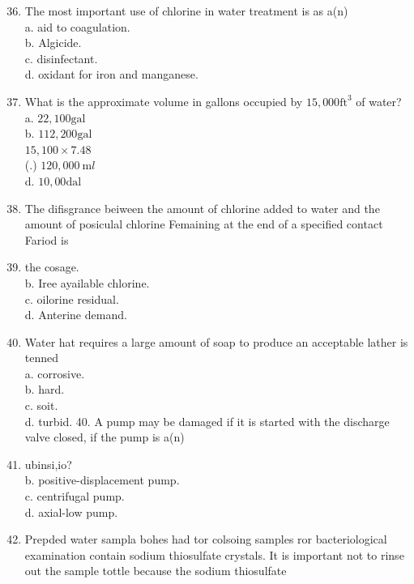 \documentclass[10pt]{article}
\begin{document}
\begin{enumerate}
  \setcounter{enumi}{35}
  \item The most important use of chlorine in water treatment is as a(n)\\
a. aid to coagulation.\\
b. Algicide.\\
c. disinfectant.\\
d. oxidant for iron and manganese.

  \item What is the approximate volume in gallons occupied by $15,000 \mathrm{ft}^{3}$ of water?\\
a. $22,100 \mathrm{gal}$\\
b. $112,200 \mathrm{gal}$\\
$15,100 \times 7.48$\\
(.) $120,000 \mathrm{~m} l$\\
d. $10,00 \mathrm{dal}$

  \item The difisgrance beiween the amount of chlorine added to water and the amount of posiculal chlorine Femaining at the end of a specified contact Fariod is

  \item the cosage.\\
b. Iree ayailable chlorine.\\
c. oilorine residual.\\
d. Anterine demand.

  \item Water hat requires a large amount of soap to produce an acceptable lather is tenned\\
a. corrosive.\\
b. hard.\\
c. soit.\\
d. turbid. 40. A pump may be damaged if it is started with the discharge valve closed, if the pump is a(n)

  \item ubinsi,io?\\
b. positive-displacement pump.\\
c. centrifugal pump.\\
d. axial-low pump.

  \item Prepded water sampla bohes had tor colsoing samples ror bacteriological examination contain sodium thiosulfate crystals. It is important not to rinse out the sample tottle because the sodium thiosulfate

\end{enumerate}
\end{document}
